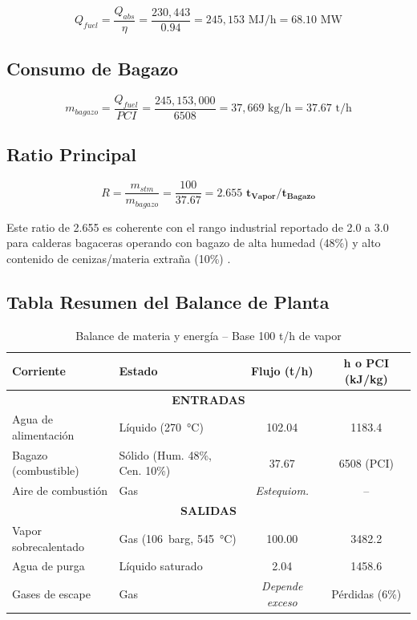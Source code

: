 \begin{equation}
	Q_{fuel} = \frac{Q_{abs}}{\eta} = \frac{230{,}443}{0.94} = 245{,}153 \text{ MJ/h} = 68.10 \text{ MW}
\end{equation}

\subsection{Consumo de Bagazo}
\begin{equation}
	m_{bagazo} = \frac{Q_{fuel}}{PCI} = \frac{245{,}153{,}000}{6508} = 37{,}669 \text{ kg/h} = 37.67 \text{ t/h}
\end{equation}

\subsection{Ratio Principal}
\begin{equation}
	\boxed{R = \frac{m_{stm}}{m_{bagazo}} = \frac{100}{37.67} = \mathbf{2.655 \text{ t}_{\text{Vapor}}/\text{t}_{\text{Bagazo}}}}
\end{equation}

Este ratio de 2.655 es coherente con el rango industrial reportado de 2.0 a 3.0 para calderas bagaceras operando con bagazo de alta humedad (48\%) y alto contenido de cenizas/materia extraña (10\%) \cite{hugot1986}.

\subsection{Tabla Resumen del Balance de Planta}

\begin{table}[H]
	\centering
	\caption{Balance de materia y energía -- Base 100 t/h de vapor}
	\label{tab:balance}
	\begin{tabular}{@{}llcc@{}}
		\toprule
		\textbf{Corriente} & \textbf{Estado} & \textbf{Flujo (t/h)} & \textbf{h o PCI (kJ/kg)} \\
		\midrule
		\multicolumn{4}{c}{\textbf{ENTRADAS}} \\
		Agua de alimentación & Líquido (\SI{270}{\celsius}) & 102.04 & 1183.4 \\
		Bagazo (combustible) & Sólido (Hum. 48\%, Cen. 10\%) & 37.67 & 6508 (PCI) \\
		Aire de combustión & Gas & \textit{Estequiom.} & -- \\
		\midrule
		\multicolumn{4}{c}{\textbf{SALIDAS}} \\
		Vapor sobrecalentado & Gas (\SI{106}{barg}, \SI{545}{\celsius}) & 100.00 & 3482.2 \\
		Agua de purga & Líquido saturado & 2.04 & 1458.6 \\
		Gases de escape & Gas & \textit{Depende exceso} & Pérdidas (6\%) \\
		\bottomrule
	\end{tabular}
\end{table}

